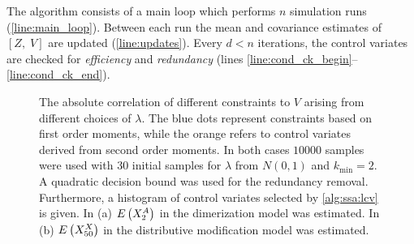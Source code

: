 The algorithm consists of a main loop which performs $n$ simulation
runs (\autoref{line:main_loop}).
Between each run the mean and covariance estimates of $[Z,\;  V]$ are
updated (\autoref{line:updates}).
Every $d<n$ iterations, the control variates are checked for  \emph{efficiency}
and \emph{redundancy} (lines \ref{line:cond_ck_begin}--\ref{line:cond_ck_end}).
\begin{figure}[htb]
  \centering
  \caption[\ac{CV} correlation charactersitics]{The absolute
    correlation of different constraints {to $V$}
    arising from different choices of $\lambda$. The blue dots
    represent constraints
    based on first order moments, while the orange refers to control
    variates derived from second
    order moments. In both cases $\num{10000}$ samples were used with
    \num{30} initial samples for $\lambda$ from $N(0,1)$ and
    $k_{\min}=2$. A quadratic decision bound was used for
    the redundancy removal. Furthermore, a histogram of control
    variates selected by \autoref{alg:ssa:lcv}
    is given.
    In (a) ${E}\left(X^A_2\right)$ in the dimerization model was estimated.
    In (b) ${E}\left(X^X_{50}\right)$ in the distributive modification model was estimated.
  }
  \label{fig:bdim}
\end{figure}

